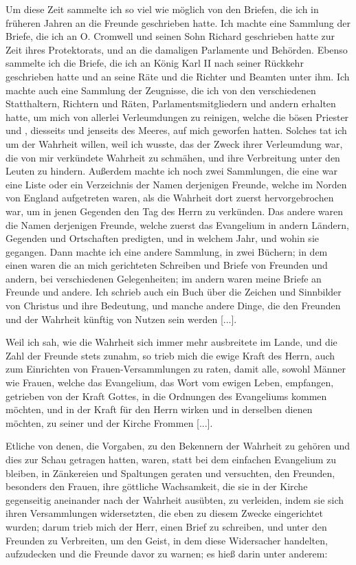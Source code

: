 Um diese Zeit sammelte ich so viel wie möglich von den
Briefen, die ich in früheren Jahren an die Freunde geschrieben
hatte. Ich machte eine Sammlung der Briefe, die ich an 
O. Cromwell und seinen Sohn Richard 
geschrieben hatte zur Zeit ihres
Protektorats, und an die damaligen Parlamente und Behörden.
Ebenso sammelte ich die Briefe, die ich an König Karl II nach
seiner Rückkehr geschrieben hatte und an seine Räte und die
Richter und Beamten unter ihm. Ich machte auch eine Sammlung 
der Zeugnisse, die ich von den verschiedenen Statthaltern,
Richtern und Räten, Parlamentsmitgliedern und andern erhalten
hatte, um mich von allerlei Verleumdungen zu reinigen, welche
die bösen Priester und , diesseits und jenseits des
Meeres, auf mich geworfen hatten. Solches tat ich um der
Wahrheit willen, weil ich wusste, das der 
Zweck ihrer Verleumdung
war, die von mir verkündete Wahrheit zu schmähen, und ihre
Verbreitung unter den Leuten zu hindern. Außerdem machte ich
noch zwei Sammlungen, die eine war eine Liste oder ein 
Verzeichnis der Namen derjenigen Freunde, welche im Norden von
England aufgetreten waren, als die Wahrheit dort zuerst 
hervorgebrochen war, um in jenen Gegenden den Tag des Herrn zu
verkünden. Das andere waren die Namen derjenigen Freunde,
welche zuerst das Evangelium in andern Ländern, Gegenden und
Ortschaften predigten, und in welchem Jahr, und wohin sie gegangen. 
Dann machte ich eine andere Sammlung, in zwei Büchern;
in dem einen waren die an mich gerichteten Schreiben und Briefe
von Freunden und andern, bei verschiedenen Gelegenheiten; im
andern waren meine Briefe an Freunde und andere. Ich schrieb
auch ein Buch über die Zeichen und Sinnbilder von Christus
und ihre Bedeutung, und manche andere Dinge, die den Freunden
und der Wahrheit künftig von Nutzen sein werden [...].

Weil ich sah, wie die Wahrheit sich immer mehr ausbreitete
im Lande, und die Zahl der Freunde stets zunahm, so trieb mich
die ewige Kraft des Herrn, auch zum Einrichten von Frauen-Versammlungen 
zu raten, damit alle, sowohl Männer wie Frauen,
welche das Evangelium, das Wort vom ewigen Leben, empfangen,
getrieben von der Kraft Gottes, in die Ordnungen des Evangeliums 
kommen möchten, und in der Kraft für den Herrn wirken
und in derselben dienen möchten, zu seiner und der Kirche
Frommen [...].

Etliche von denen, die Vorgaben, zu den Bekennern der
Wahrheit zu gehören und dies zur Schau getragen hatten,
waren, statt bei dem einfachen Evangelium zu bleiben, in
Zänkereien und Spaltungen 
geraten und versuchten, den Freunden,
besonders den Frauen, ihre göttliche Wachsamkeit, die sie in der
Kirche gegenseitig aneinander nach der Wahrheit ausübten, zu
verleiden, indem sie sich ihren Versammlungen widersetzten, die
eben zu diesem Zwecke eingerichtet wurden; darum trieb mich der
Herr, einen Brief zu schreiben, und unter den Freunden zu 
Verbreiten, um den Geist, in dem diese Widersacher handelten, 
aufzudecken und die Freunde davor zu warnen; es hieß darin
unter anderem:

